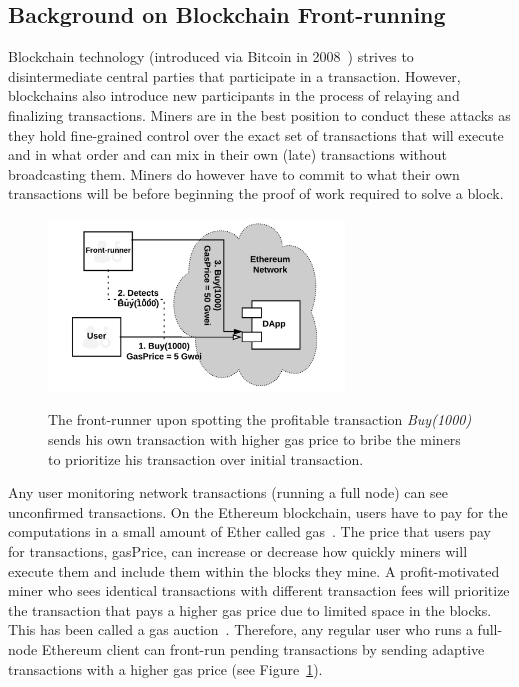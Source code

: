 \subsection{Background on Blockchain Front-running} \label{sec:Front Running on the Blockchains}

Blockchain technology (introduced via Bitcoin in 2008~\cite{nakamoto2008bitcoin}) strives to disintermediate central parties that participate in a transaction. However, blockchains also introduce new participants in the process of relaying and finalizing transactions. Miners are in the best position to conduct these attacks as they hold fine-grained control over the exact set of transactions that will execute and in what order and can mix in their own (late) transactions without broadcasting them. Miners do however have to commit to what their own transactions will be before beginning the proof of work required to solve a block.

\begin{figure}[t]
    \centering
    {\includegraphics[width=0.7\textwidth]{figures/Regular_frontrunning.png}}
    {\caption[Simple Front-running Flow on a Blockchain]{The front-runner upon spotting the profitable transaction \textit{Buy(1000)} sends his own transaction with higher gas price to bribe the miners to prioritize his transaction over initial transaction.}\label{fig:RegularFrontrunning}}
    \end{figure}

    
Any user monitoring network transactions (\eg running a full node) can see unconfirmed transactions. On the Ethereum blockchain, users have to pay for the computations in a small amount of Ether called \textsf{gas}~\cite{AccountT67:online}. The price that users pay for transactions, \textsf{gasPrice}, can increase or decrease how quickly miners will execute them and include them within the blocks they mine. A profit-motivated miner who sees identical transactions with different transaction fees will prioritize the transaction that pays a higher gas price due to limited space in the blocks. This has been called a gas auction~\cite{frontrunme}. Therefore, any regular user who runs a full-node Ethereum client can front-run pending transactions by sending adaptive transactions with a higher gas price (see Figure~\ref{fig:RegularFrontrunning}).

